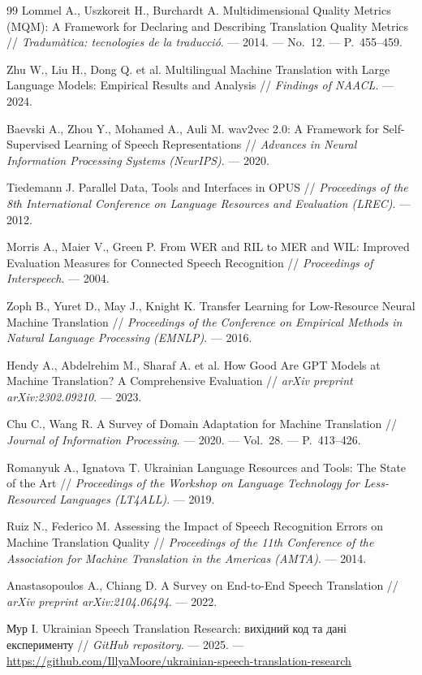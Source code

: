 \begin{thebibliography}{99}
Lommel A., Uszkoreit H., Burchardt A.
Multidimensional Quality Metrics (MQM): A Framework for Declaring and
Describing Translation Quality Metrics //
\textit{Tradumàtica: tecnologies de la traducció}. --- 2014. --- No.~12.
--- P.~455--459.

Zhu W., Liu H., Dong Q. et al.
Multilingual Machine Translation with Large Language Models: Empirical
Results and Analysis //
\textit{Findings of NAACL}. --- 2024.

Baevski A., Zhou Y., Mohamed A., Auli M.
wav2vec 2.0: A Framework for Self-Supervised Learning of Speech
Representations //
\textit{Advances in Neural Information Processing Systems (NeurIPS)}. --- 2020.

Tiedemann J.
Parallel Data, Tools and Interfaces in OPUS //
\textit{Proceedings of the 8th International Conference on Language
Resources and Evaluation (LREC)}. --- 2012.

Morris A., Maier V., Green P.
From WER and RIL to MER and WIL: Improved Evaluation Measures for
Connected Speech Recognition //
\textit{Proceedings of Interspeech}. --- 2004.

Zoph B., Yuret D., May J., Knight K.
Transfer Learning for Low-Resource Neural Machine Translation //
\textit{Proceedings of the Conference on Empirical Methods in Natural
Language Processing (EMNLP)}. --- 2016.

Hendy A., Abdelrehim M., Sharaf A. et al.
How Good Are GPT Models at Machine Translation? A Comprehensive Evaluation //
\textit{arXiv preprint arXiv:2302.09210}. --- 2023.

Chu C., Wang R.
A Survey of Domain Adaptation for Machine Translation //
\textit{Journal of Information Processing}. --- 2020. --- Vol.~28.
--- P.~413--426.

Romanyuk A., Ignatova T.
Ukrainian Language Resources and Tools: The State of the Art //
\textit{Proceedings of the Workshop on Language Technology for
Less-Resourced Languages (LT4ALL)}. --- 2019.

Ruiz N., Federico M.
Assessing the Impact of Speech Recognition Errors on Machine Translation
Quality //
\textit{Proceedings of the 11th Conference of the Association for Machine
Translation in the Americas (AMTA)}. --- 2014.

Anastasopoulos A., Chiang D.
A Survey on End-to-End Speech Translation //
\textit{arXiv preprint arXiv:2104.06494}. --- 2022.

Мур І.
Ukrainian Speech Translation Research: вихідний код та дані експерименту //
\textit{GitHub repository}. --- 2025. ---
\url{https://github.com/IllyaMoore/ukrainian-speech-translation-research}

\end{thebibliography}